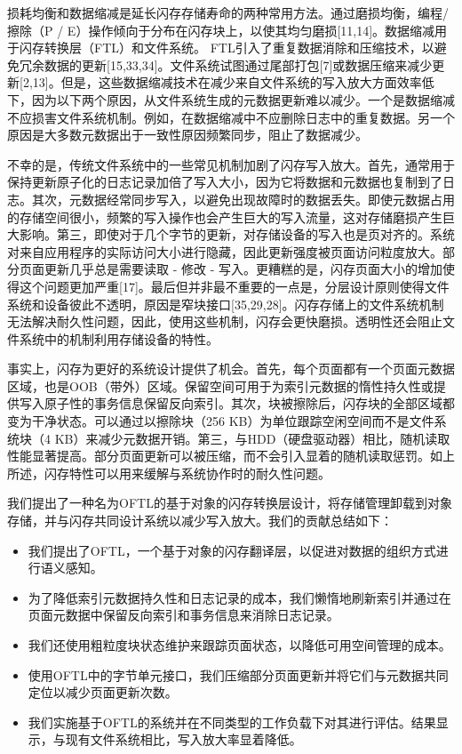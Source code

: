 损耗均衡和数据缩减是延长闪存存储寿命的两种常用方法。通过磨损均衡，编程/擦除（P / E）操作倾向于分布在闪存块上，以使其均匀磨损[11,14]。数据缩减用于闪存转换层（FTL）和文件系统。 FTL引入了重复数据消除和压缩技术，以避免冗余数据的更新[15,33,34]。文件系统试图通过尾部打包[7]或数据压缩来减少更新[2,13]。但是，这些数据缩减技术在减少来自文件系统的写入放大方面效率低下，因为以下两个原因，从文件系统生成的元数据更新难以减少。一个是数据缩减不应损害文件系统机制。例如，在数据缩减中不应删除日志中的重复数据。另一个原因是大多数元数据出于一致性原因频繁同步，阻止了数据减少。

不幸的是，传统文件系统中的一些常见机制加剧了闪存写入放大。首先，通常用于保持更新原子化的日志记录加倍了写入大小，因为它将数据和元数据也复制到了日志。其次，元数据经常同步写入，以避免出现故障时的数据丢失。即使元数据占用的存储空间很小，频繁的写入操作也会产生巨大的写入流量，这对存储磨损产生巨大影响。第三，即使对于几个字节的更新，对存储设备的写入也是页对齐的。系统对来自应用程序的实际访问大小进行隐藏，因此更新强度被页面访问粒度放大。部分页面更新几乎总是需要读取 - 修改 - 写入。更糟糕的是，闪存页面大小的增加使得这个问题更加严重[17]。最后但并非最不重要的一点是，分层设计原则使得文件系统和设备彼此不透明，原因是窄块接口[35,29,28]。闪存存储上的文件系统机制无法解决耐久性问题，因此，使用这些机制，闪存会更快磨损。透明性还会阻止文件系统中的机制利用存储设备的特性。

事实上，闪存为更好的系统设计提供了机会。首先，每个页面都有一个页面元数据区域，也是OOB（带外）区域。保留空间可用于为索引元数据的惰性持久性或提供写入原子性的事务信息保留反向索引。其次，块被擦除后，闪存块的全部区域都变为干净状态。可以通过以擦除块（256 KB）为单位跟踪空闲空间而不是文件系统块（4 KB）来减少元数据开销。第三，与HDD（硬盘驱动器）相比，随机读取性能显著提高。部分页面更新可以被压缩，而不会引入显着的随机读取惩罚。如上所述，闪存特性可以用来缓解与系统协作时的耐久性问题。

我们提出了一种名为OFTL的基于对象的闪存转换层设计，将存储管理卸载到对象存储，并与闪存共同设计系统以减少写入放大。我们的贡献总结如下：

\begin{itemize}
\item 我们提出了OFTL，一个基于对象的闪存翻译层，以促进对数据的组织方式进行语义感知。
\item 为了降低索引元数据持久性和日志记录的成本，我们懒惰地刷新索引并通过在页面元数据中保留反向索引和事务信息来消除日志记录。
\item 我们还使用粗粒度块状态维护来跟踪页面状态，以降低可用空间管理的成本。
\item 使用OFTL中的字节单元接口，我们压缩部分页面更新并将它们与元数据共同定位以减少页面更新次数。
\item 我们实施基于OFTL的系统并在不同类型的工作负载下对其进行评估。结果显示，与现有文件系统相比，写入放大率显着降低。
\end{itemize}

